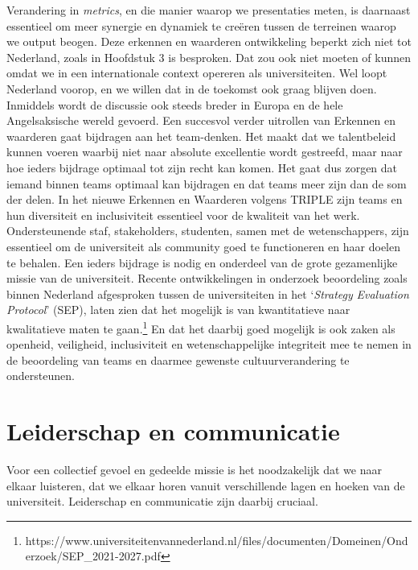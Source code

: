 \documentclass[smallauthor, chapterhaspagenum, nochapterinheader, pagenuminheader,  bigchapnum,medium2, tocpages, garamond, titleinheader]{jote-book}
\begin{document}
	Verandering in \emph{metrics}, en die manier waarop we presentaties meten, is daarnaast essentieel om meer synergie en dynamiek te creëren tussen de terreinen waarop we output beogen. Deze erkennen en waarderen ontwikkeling beperkt zich niet tot Nederland, zoals in Hoofdstuk 3 is besproken. Dat zou ook niet moeten of kunnen omdat we in een internationale context opereren als universiteiten. Wel loopt Nederland voorop, en we willen dat in de toekomst ook graag blijven doen. Inmiddels wordt de discussie ook steeds breder in Europa en de hele Angelsaksische wereld gevoerd. Een succesvol verder uitrollen van Erkennen en waarderen gaat bijdragen aan het team-denken. Het maakt dat we talentbeleid kunnen voeren waarbij niet naar absolute excellentie wordt gestreefd, maar naar hoe ieders bijdrage optimaal tot zijn recht kan komen. Het gaat dus zorgen dat iemand binnen teams optimaal kan bijdragen en dat teams meer zijn dan de som der delen. In het nieuwe Erkennen en Waarderen volgens TRIPLE zijn teams en hun diversiteit en inclusiviteit essentieel voor de kwaliteit van het werk. Ondersteunende staf, stakeholders, studenten, samen met de wetenschappers, zijn essentieel om de universiteit als community goed te functioneren en haar doelen te behalen. Een ieders bijdrage is nodig en onderdeel van de grote gezamenlijke missie van de universiteit. Recente ontwikkelingen in onderzoek beoordeling zoals binnen Nederland afgesproken tussen de universiteiten in het ‘\emph{Strategy}\emph{ Evaluation Protocol}' (SEP), laten zien dat het mogelijk is van kwantitatieve naar kwalitatieve maten te gaan.\footnote{https://www.universiteitenvannederland.nl/files/documenten/Domeinen/Onderzoek/SEP\_2021-2027.pdf} En dat het daarbij goed mogelijk is ook zaken als openheid, veiligheid, inclusiviteit en wetenschappelijke integriteit mee te nemen in de beoordeling van teams en daarmee gewenste cultuurverandering te ondersteunen.



	\section{Leiderschap en communicatie}



	Voor een collectief gevoel en gedeelde missie is het noodzakelijk dat we naar elkaar luisteren, dat we elkaar horen vanuit verschillende lagen en hoeken van de universiteit. Leiderschap en communicatie zijn daarbij cruciaal.
\end{document}

